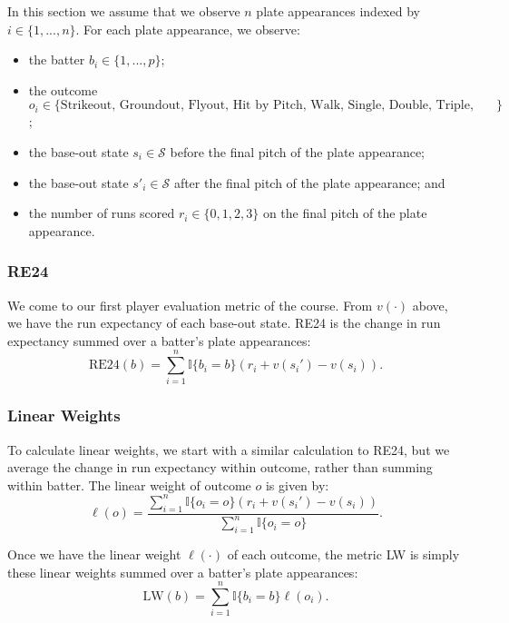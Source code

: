 \documentclass{article}
\begin{document}
      In this section we assume that we observe $n$ plate appearances indexed by $i \in \{1, ..., n\}$. For each plate appearance, we observe:
      \begin{itemize}
        \item the batter $b_i \in \{1, ..., p\}$;
        \item the outcome $o_i \in \{\mbox{Strikeout, Groundout, Flyout, Hit by Pitch, Walk, Single, Double, Triple, Home Run}\}$;
        \item the base-out state $s_i \in \mathcal{S}$ before the final pitch of the plate appearance;
        \item the base-out state $s'_i \in \mathcal{S}$ after the final pitch of the plate appearance; and
        \item the number of runs scored $r_i \in \{0, 1, 2, 3\}$ on the final pitch of the plate appearance.
      \end{itemize}

      \subsubsection{\sc RE24}

        We come to our first player evaluation metric of the course. From $v(\cdot)$ above, we have the run expectancy of each base-out state. RE24 is the change in run expectancy summed over a batter's plate appearances:
        \begin{equation*}
          \text{RE24}(b) = \sum_{i = 1}^n \mathbb{I}\{b_i = b\} (r_i + v(s_i') - v(s_i)).
        \end{equation*}

      \subsubsection{\sc Linear Weights}

        To calculate linear weights, we start with a similar calculation to RE24, but we average the change in run expectancy within outcome, rather than summing within batter. The linear weight of outcome $o$ is given by:
        \begin{equation*}
          \ell(o) = \frac{
            \sum_{i = 1}^n \mathbb{I}\{o_i = o\} (r_i + v(s_i') - v(s_i))
          }{
            \sum_{i = 1}^n \mathbb{I}\{o_i = o\}
          }.
        \end{equation*}

        Once we have the linear weight $\ell(\cdot)$ of each outcome, the metric LW is simply these linear weights summed over a batter's plate appearances:
        \begin{equation*}
          \text{LW}(b) = \sum_{i = 1}^n \mathbb{I}\{b_i = b\} \ell(o_i).
        \end{equation*}
\end{document}
